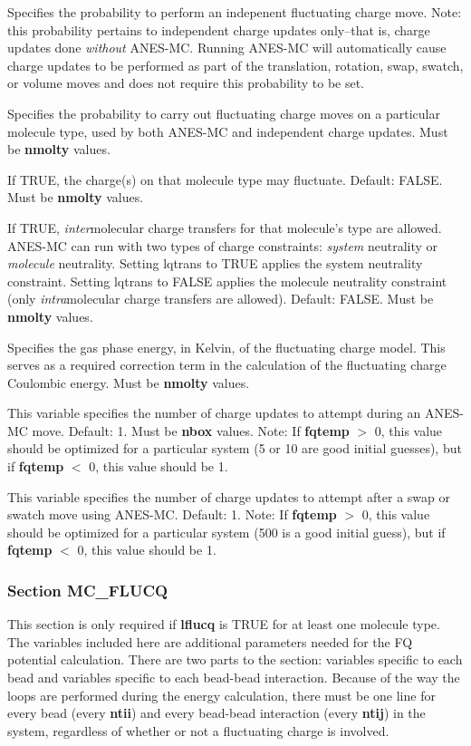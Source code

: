 \documentclass[12pt,letterpaper]{article}
\begin{document}
 Specifies the probability to perform
an indepenent fluctuating charge move. Note: this probability pertains to
independent charge updates only--that is, charge updates done
{\sl without} ANES-MC. Running ANES-MC will automatically 
cause charge updates to be performed as part of the translation, 
rotation, swap, swatch, or volume moves and
does not require this probability to be set.

 Specifies the probability to
carry out fluctuating charge moves on a particular molecule type,
used by both ANES-MC and independent charge updates. 
Must be {\bf nmolty} values.

 If TRUE, the charge(s) on that
molecule type may fluctuate. Default: FALSE. 
Must be {\bf nmolty} values.

 If TRUE, {\sl inter}molecular charge
transfers for that molecule's type are allowed. ANES-MC can run with
two types of charge constraints: {\sl system} neutrality or {\sl molecule} neutrality.
Setting lqtrans to TRUE applies the system neutrality constraint. Setting
lqtrans to FALSE applies the molecule neutrality constraint (only 
{\sl intra}molecular charge transfers are allowed).
Default: FALSE.  Must be {\bf nmolty} values.

 Specifies the gas phase energy, in Kelvin, of the
fluctuating charge model. This serves as a required correction term in the
calculation of the fluctuating charge Coulombic energy. 
Must be {\bf nmolty} values.

 This variable specifies the number of
charge updates to attempt during an ANES-MC move. Default: 1. 
Must be {\bf nbox} values. 
Note: 
If {\bf fqtemp} $>$ 0, this value should be optimized for a particular system
(5 or 10 are good initial guesses), but if {\bf fqtemp} $<$ 0, this value 
should be 1.

 This variable specifies the number of
charge updates to attempt after a swap or swatch move using ANES-MC. 
Default: 1. Note: 
If {\bf fqtemp} $>$ 0, this value should be optimized for a particular system
(500 is a good initial guess), but if {\bf fqtemp} $<$ 0, this value 
should be 1.

\subsubsection{Section \textbf{MC\_FLUCQ}}

This section is only required if {\bf lflucq} is TRUE for at least one molecule type.
The variables included here are additional parameters needed for the
FQ potential calculation. There are two parts to the section: variables specific 
to each bead and variables specific to each bead-bead interaction.
Because of the way the loops are performed during the energy calculation, there 
must be one line for every bead (every {\bf ntii}) and every bead-bead interaction 
(every {\bf ntij}) in the system, regardless of whether or not a fluctuating charge
is involved.
\end{document}
